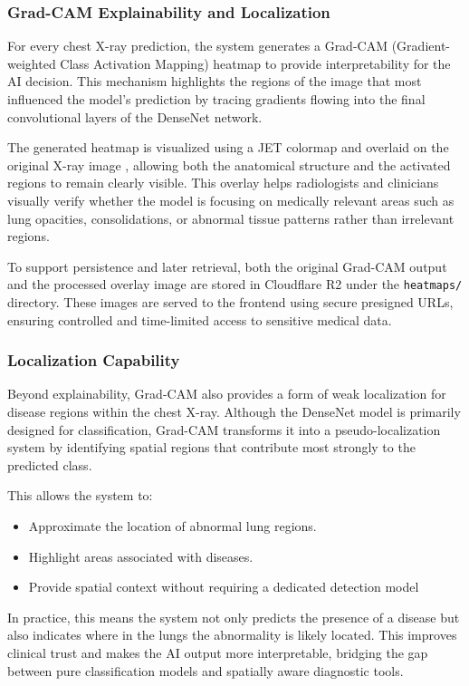\subsubsection{Grad-CAM Explainability and Localization}
For every chest X-ray prediction, the system generates a Grad-CAM (Gradient-weighted Class Activation Mapping) heatmap to provide interpretability for the AI decision. This mechanism highlights the regions of the image that most influenced the model’s prediction by tracing gradients flowing into the final convolutional layers of the DenseNet network.

The generated heatmap is visualized using a JET colormap and overlaid on the original X-ray image , allowing both the anatomical structure and the activated regions to remain clearly visible. This overlay helps radiologists and clinicians visually verify whether the model is focusing on medically relevant areas such as lung opacities, consolidations, or abnormal tissue patterns rather than irrelevant regions.

To support persistence and later retrieval, both the original Grad-CAM output and the processed overlay image are stored in Cloudflare R2 under the \texttt{heatmaps/} directory. These images are served to the frontend using secure presigned URLs, ensuring controlled and time-limited access to sensitive medical data.

\subsubsection{Localization Capability}Beyond explainability, Grad-CAM also provides a form of weak localization for disease regions within the chest X-ray. Although the DenseNet model is primarily designed for classification, Grad-CAM transforms it into a pseudo-localization system by identifying spatial regions that contribute most strongly to the predicted class.

This allows the system to:
\begin{itemize}
	\item Approximate the location of abnormal lung regions.
	\item Highlight areas associated with diseases.
	\item Provide spatial context without requiring a dedicated detection model   
\end{itemize}

In practice, this means the system not only predicts the presence of a disease but also indicates where in the lungs the abnormality is likely located. This improves clinical trust and makes the AI output more interpretable, bridging the gap between pure classification models and spatially aware diagnostic tools.

